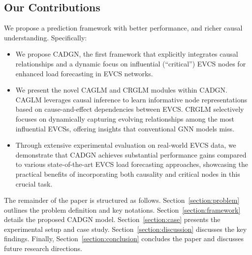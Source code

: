 \documentclass[lettersize,journal]{IEEEtran}
\begin{document}

\subsection{Our Contributions} 
We propose a prediction framework with better performance, and richer causal understanding. Specifically: 
\begin{itemize}
	\item  We propose CADGN, the first framework that explicitly integrates causal relationships and a dynamic focus on influential (``critical'') EVCS nodes for enhanced load forecasting in EVCS networks.
	\item  We present the novel CAGLM and CRGLM modules within CADGN. CAGLM leverages causal inference to learn informative node representations based on cause-and-effect dependencies between EVCS.  CRGLM selectively focuses on dynamically capturing evolving relationships among the most influential EVCSs, offering insights that conventional GNN models miss.
	\item  Through extensive experimental evaluation on real-world EVCS data, we demonstrate that CADGN achieves substantial performance gains compared to various state-of-the-art EVCS load forecasting approaches, showcasing the practical benefits of incorporating both causality and critical nodes in this crucial task.
\end{itemize}

The remainder of the paper is structured as follows.
Section~\ref{section:problem} outlines the problem definition and key notations. Section~\ref{section:framework} details the proposed CADGN model. Section~\ref{section:case} presents the experimental setup and case study.
Section~\ref{section:discussion} discusses the key findings.
Finally, Section~\ref{section:conclusion} concludes the paper and discusses future research directions.
\end{document}
